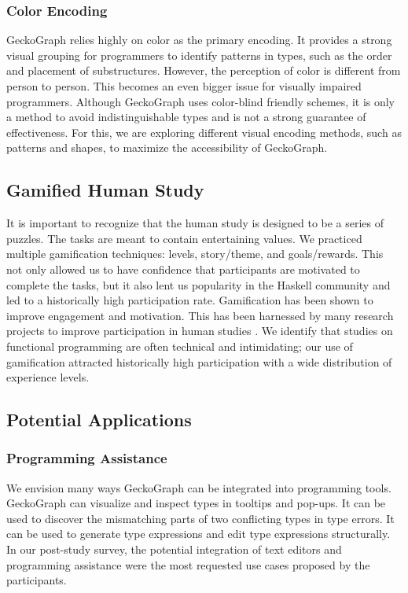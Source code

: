 \documentclass[preprint,12pt]{elsarticle}
\begin{document}
\subsubsection{Color Encoding}
GeckoGraph relies highly on color as the primary encoding. It provides a strong visual grouping  \cite{Zeng2023-jz}  for programmers to identify patterns in types, such as the order and placement of substructures. However, the perception of color is different from person to person. This becomes an even bigger issue for visually impaired programmers. Although GeckoGraph uses color-blind friendly schemes, it is only a method to avoid indistinguishable types and is not a strong guarantee of effectiveness. For this, we are exploring different visual encoding methods, such as patterns and shapes, to maximize the accessibility of GeckoGraph. 


\subsection{Gamified Human Study}

It is important to recognize that the human study is designed to be a series of puzzles. The tasks are meant to contain entertaining values. We practiced multiple gamification techniques: levels, story/theme, and goals/rewards. \cite{Hamari2014-mc} This not only allowed us to have confidence that participants are motivated to complete the tasks, but it also lent us popularity in the Haskell community and led to a historically high participation rate. Gamification has been shown to improve engagement and motivation. This has been harnessed by many research projects to improve participation in human studies \cite{He2014-vp}. We identify that studies on functional programming are often technical and intimidating; our use of gamification attracted historically high participation with a wide distribution of experience levels. 

\subsection{Potential Applications}
\subsubsection{Programming Assistance}
We envision many ways GeckoGraph can be integrated into programming tools. GeckoGraph can visualize and inspect types in tooltips and pop-ups. It can be used to discover the mismatching parts of two conflicting types in type errors. It can be used to generate type expressions and edit type expressions structurally. In our post-study survey, the potential integration of text editors and programming assistance were the most requested use cases proposed by the participants. 
\end{document}
